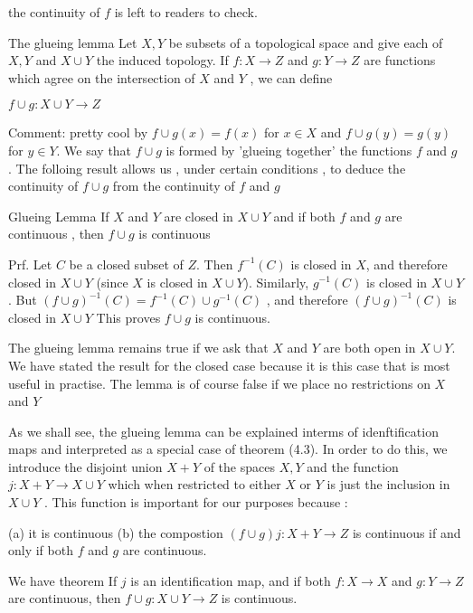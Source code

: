 \documentclass[a4paper, 10pt]{ctexart} %
\begin{document}
 the continuity of $f$ is left to readers to check.

 The glueing lemma 
 Let $X , Y$ be subsets of a topological space and give each of $X ,Y$ and $X \cup Y$ the induced topology. If $f : X \to Z $ and $g : Y \to Z$ are functions which agree on the intersection of $X$ and $Y$ , we can define 

 $f \cup g : X \cup  Y \to Z$

 Comment: pretty cool 
 by $f \cup  g \left(x\right)  = f \left(x\right) $ for $x \in X$ and $f \cup  g \left(y\right) =  g \left(y\right)$ for $ y\in Y$. We say that $f \cup g$  is formed by 'glueing together' the functions $f$ and $g$ . The folloing result allows us , under certain conditions , to deduce the continuity of $f \cup  g$ from the continuity of $f $ and $g$

 Glueing Lemma If $X$ and $Y$ are closed in $X \cup  Y$ and if both $f$ and $g$ are continuous , then $f \cup  g$ is continuous 

 Prf. Let $C$ be a closed subset of $Z$. Then $f ^{-1}  \left(C\right)$ is closed in $X$, and therefore closed in $X \cup  Y$ (since $X$ is closed in $X \cup  Y$). Similarly, $g ^{-1}  \left(C\right)$ is closed in $X  \cup  Y$ . But $ \left( f \cup  g  \right) ^{-1}  \left(C\right) = f ^{-1} \left(C\right) \cup g^{-1}  \left(C\right)$ , and therefore $\left(f \cup  g    \right) ^{-1}  \left(C\right)$ is closed in $X \cup  Y$ This proves $f \cup  g$ is continuous.

 The glueing lemma remains true if we ask that $X $ and $Y$ are both open in $X \cup Y$. We have stated the result for the closed case because it is this case that is most useful in practise. The lemma is of course false if we place no restrictions on $X$ and $Y$ 

 As we shall see, the glueing lemma can be explained interms of idenftification maps and interpreted as a special case of theorem (4.3). In order to do this, we introduce the disjoint union $X + Y$ of the spaces $X, Y$ and the function $j : X + Y \to X \cup  Y$ which when restricted to either $X $ or $Y$ is just the inclusion in $X \cup  Y   $ . This function is important for our purposes because : 

 (a) it is continuous 
 (b) the compostion $\left(f \cup g\right)j : X + Y \to Z$ is continuous if and only if both $f $ and $g$ are continuous. 

 We have theorem If $j$ is an identification map, and if both $f : X \to X$ and $g :Y \to Z$ are continuous, then $f \cup  g : X \cup  Y \to Z  $ is continuous.
\end{document}
